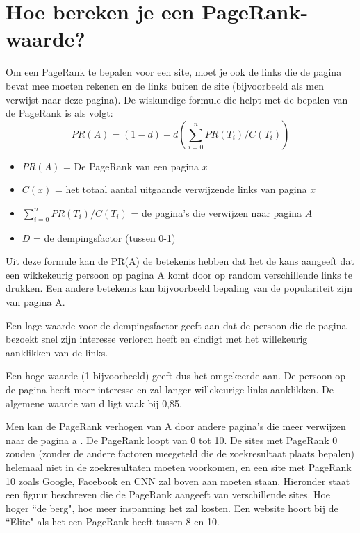 \documentclass[12pt,a4paper]{article}
\begin{document}
\section{Hoe bereken je een PageRank-waarde?}
Om een PageRank te bepalen voor een site, moet je ook de links die de pagina bevat mee moeten rekenen en de links buiten de site (bijvoorbeeld als men verwijst naar deze pagina). De wiskundige formule die helpt met de bepalen van de PageRank is als volgt: 
\[PR(A) = (1 - d) + d(\sum_{i=0}^{n}PR(T_{i})/C(T_{i}))\]
\begin{itemize}
\item $PR(A)$ = De PageRank van een pagina $x$
\item $C(x)$ = het totaal aantal uitgaande verwijzende links van pagina $x$
\item $\sum_{i=0}^{n}PR(T_{i})/C(T_{i})$ = de pagina's die verwijzen naar pagina $A$
\item $D$ = de dempingsfactor (tussen 0-1)
\end{itemize}

Uit deze formule kan de PR(A) de betekenis hebben dat het de kans aangeeft dat een wikkekeurig persoon op pagina A komt door op random verschillende links te drukken. Een andere betekenis kan bijvoorbeeld bepaling van de populariteit zijn van pagina A. 
\vspace{1pc}

Een lage waarde voor de dempingsfactor geeft aan dat de persoon die de pagina bezoekt snel zijn interesse verloren heeft en eindigt met het willekeurig aanklikken van de links.

Een hoge waarde (1 bijvoorbeeld) geeft dus het omgekeerde aan. De persoon op de pagina heeft meer interesse en zal langer willekeurige links aanklikken. De algemene waarde van d ligt vaak bij 0,85. 
\vspace{1pc}

Men kan de PageRank verhogen van A door andere pagina's die meer verwijzen naar de pagina a \cite{1}. De PageRank loopt van 0 tot 10. De sites met PageRank 0 zouden (zonder de andere factoren meegeteld die de zoekresultaat plaats bepalen) helemaal niet in de zoekresultaten moeten voorkomen, en een site met PageRank 10 zoals Google, Facebook en CNN zal boven aan moeten staan. Hieronder staat een figuur beschreven die de PageRank aangeeft van verschillende sites. Hoe hoger ``de berg", hoe meer inspanning het zal kosten. Een website hoort bij de ``Elite" als het een PageRank heeft tussen 8 en 10. \cite{3}
\end{document}

